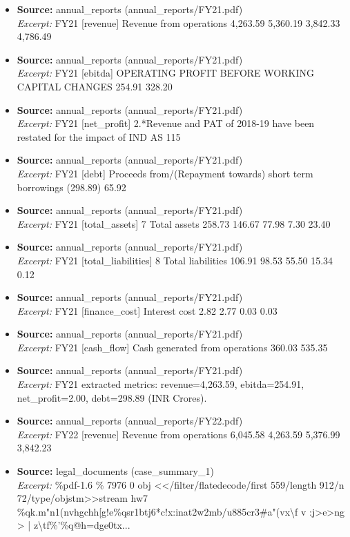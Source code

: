 \documentclass[11pt,a4paper]{article}
\begin{document}
\begin{itemize}
\item \textbf{Source:} annual\_reports (annual\_reports/FY21.pdf) \\ \textit{Excerpt:} FY21 [revenue] Revenue from operations 4,263.59 5,360.19 3,842.33 4,786.49
\item \textbf{Source:} annual\_reports (annual\_reports/FY21.pdf) \\ \textit{Excerpt:} FY21 [ebitda] OPERATING PROFIT BEFORE WORKING CAPITAL CHANGES 254.91 328.20
\item \textbf{Source:} annual\_reports (annual\_reports/FY21.pdf) \\ \textit{Excerpt:} FY21 [net\_profit] 2.*Revenue and PAT of 2018-19 have been restated for the impact of IND AS 115
\item \textbf{Source:} annual\_reports (annual\_reports/FY21.pdf) \\ \textit{Excerpt:} FY21 [debt] Proceeds from/(Repayment towards) short term borrowings (298.89) 65.92
\item \textbf{Source:} annual\_reports (annual\_reports/FY21.pdf) \\ \textit{Excerpt:} FY21 [total\_assets] 7 Total assets 258.73 146.67 77.98 7.30 23.40
\item \textbf{Source:} annual\_reports (annual\_reports/FY21.pdf) \\ \textit{Excerpt:} FY21 [total\_liabilities] 8 Total liabilities 106.91 98.53 55.50 15.34 0.12
\item \textbf{Source:} annual\_reports (annual\_reports/FY21.pdf) \\ \textit{Excerpt:} FY21 [finance\_cost] Interest cost 2.82 2.77 0.03 0.03
\item \textbf{Source:} annual\_reports (annual\_reports/FY21.pdf) \\ \textit{Excerpt:} FY21 [cash\_flow] Cash generated from operations 360.03 535.35
\item \textbf{Source:} annual\_reports (annual\_reports/FY21.pdf) \\ \textit{Excerpt:} FY21 extracted metrics: revenue=4,263.59, ebitda=254.91, net\_profit=2.00, debt=298.89 (INR Crores).
\item \textbf{Source:} annual\_reports (annual\_reports/FY22.pdf) \\ \textit{Excerpt:} FY22 [revenue] Revenue from operations 6,045.58 4,263.59 5,376.99 3,842.23
\item \textbf{Source:} legal\_documents (case\_summary\_1) \\ \textit{Excerpt:} \%pdf-1.6 \% 7976 0 obj <</filter/flatedecode/first 559/length 912/n 72/type/objstm>>stream hw7 \%qk.m"n1(nvhgchh[g!e\%qsr1btj6*c!x:inat2w2mb/u885cr3\#a"(vx\textbackslash{}f v :j>e>ng > | z\textbackslash{}tf\%'\%q@h=dge0tx...

\end{itemize}
\end{document}
